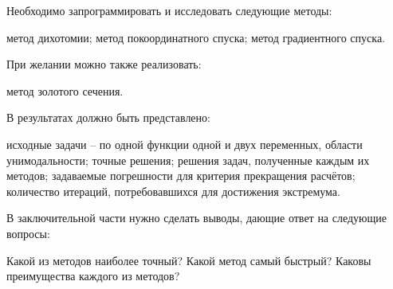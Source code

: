 Необходимо запрограммировать и исследовать следующие методы:

метод дихотомии; метод покоординатного спуска; метод градиентного
спуска.

При желании можно также реализовать:

метод золотого сечения.

В результатах должно быть представлено:

исходные задачи – по одной функции одной и двух переменных, области
унимодальности; точные решения; решения задач, полученные каждым их
методов; задаваемые погрешности для критерия прекращения расчётов;
количество итераций, потребовавшихся для достижения экстремума.

В заключительной части нужно сделать выводы, дающие ответ на следующие
вопросы:

Какой из методов наиболее точный? Какой метод самый быстрый? Каковы
преимущества каждого из методов?

\Questions
